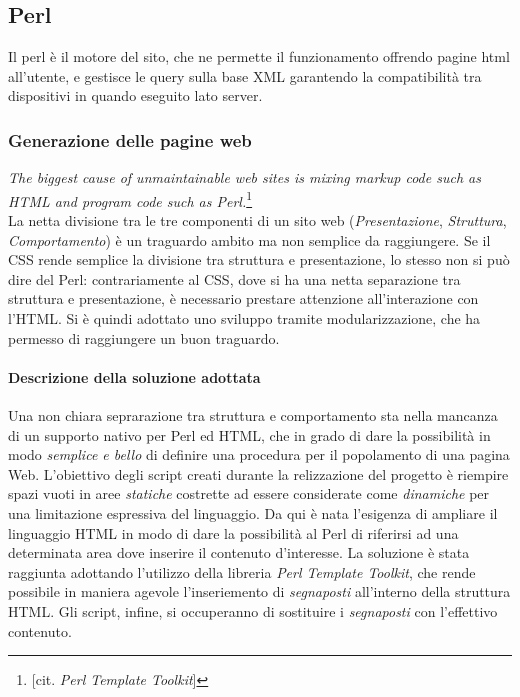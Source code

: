 \subsection{Perl}
Il perl \`e il motore del sito, che ne permette il funzionamento offrendo pagine html all'utente, e gestisce le query sulla base XML garantendo la compatibilit\`a tra dispositivi in quando eseguito lato server.
\subsubsection{Generazione delle pagine web}
\textit{The biggest cause of unmaintainable web sites is mixing markup code such as HTML and program code such as Perl.}\footnote{[cit. \textit{Perl Template Toolkit}]}\\

La netta divisione tra le tre componenti di un sito web (\textit{Presentazione}, \textit{Struttura}, \textit{Comportamento}) \`e un traguardo ambito ma non semplice da raggiungere. Se il CSS rende semplice la divisione tra struttura e presentazione, lo stesso non si pu\`o dire del Perl: contrariamente al CSS, dove si ha una netta separazione tra struttura e presentazione, \`e necessario prestare attenzione all'interazione con l'HTML. Si \`e quindi adottato uno sviluppo tramite modularizzazione, che ha permesso di raggiungere un buon traguardo.

\paragraph*{Descrizione della soluzione adottata}Una non chiara seprarazione tra struttura e comportamento sta nella mancanza di un supporto nativo per Perl ed HTML, che in grado di dare la possibilit\`a in modo \textit{semplice e bello} di definire una procedura per il popolamento di una pagina Web. L'obiettivo degli script creati durante la relizzazione del progetto \`e riempire spazi vuoti in aree \textit{statiche} costrette ad essere considerate come \textit{dinamiche} per una limitazione espressiva del linguaggio. Da qui \`e nata l'esigenza di ampliare il linguaggio HTML in modo di dare la possibilit\`a al Perl di riferirsi ad una determinata area dove inserire il contenuto d'interesse. La soluzione \`e stata raggiunta adottando l'utilizzo della libreria \textit{Perl Template Toolkit}, che rende possibile in maniera agevole l'inseriemento di \textit{segnaposti} all'interno della struttura HTML. Gli script, infine, si occuperanno di sostituire i \textit{segnaposti} con l'effettivo contenuto.
